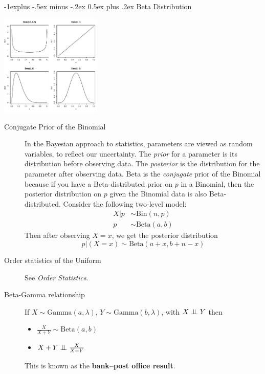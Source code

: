 \documentclass[6pt, landscape]{article}
\makeatletter
\renewcommand{\subsection}{\@startsection{subsection}{2}{0mm}%
                                {-1explus -.5ex minus -.2ex}%
                                {0.5ex plus .2ex}%
                                {\small\bfseries}}
\newcommand{\Bin}{\textrm{Bin}}
\newcommand{\Beta}{\textrm{Beta}}
\newcommand{\Gam}{\textrm{Gamma}}
\newcommand\independent{\protect\mathpalette{\protect\independenT}{\perp}}
\def\independenT#1#2{\mathrel{\setbox0\hbox{$#1#2$}%
    \copy0\kern-\wd0\mkern4mu\box0}}
\makeatother
\begin{document}
\begin{multicols}{3}
        \subsection{Beta Distribution}
        \begin{minipage}{\linewidth}
                \centering
                \includegraphics[width=1.9in]{figures/Betapdfs.pdf}
        \end{minipage}
        \medskip

        \begin{description}

                \item[Conjugate Prior of the Binomial] In the Bayesian approach to statistics, parameters are viewed as random variables, to reflect our uncertainty. The \emph{prior} for a parameter is its distribution before observing data. The \emph{posterior}  is the distribution for the parameter after observing data. Beta is the \emph{conjugate} prior of the Binomial because if you have a Beta-distributed prior on $p$ in a Binomial, then the posterior distribution on $p$ given the Binomial data is also Beta-distributed. Consider the following two-level model:
                      \begin{align*}
                              X|p & \sim \Bin(n, p)  \\
                              p   & \sim \Beta(a, b)
                      \end{align*}
                      Then after observing  $X = x$, we get the posterior distribution
                      \[p|(X=x) \sim \Beta(a + x, b + n - x) \]

                \item[Order statistics of the Uniform] See \emph{Order Statistics}.
                \item[Beta-Gamma relationship] If $X \sim \Gam(a, \lambda)$, $Y \sim \Gam(b, \lambda)$, with $X \independent Y$ then
                      \begin{itemize}
                              \item $\frac{X}{X + Y} \sim \Beta(a, b)$
                              \item $X + Y \independent \frac{X}{X + Y}$
                      \end{itemize}
                      This is known as the \textbf{bank--post office result}.
        \end{description}



\end{multicols}
\end{document}
